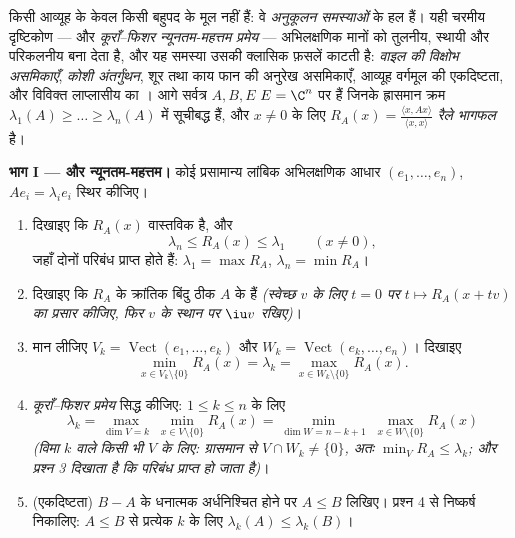 \begin{problem}\label{pb:b2:hermitian:1}
किसी  आव्यूह के  केवल किसी बहुपद के मूल नहीं हैं:
वे \emph{अनुकूलन समस्याओं} के हल हैं। यही चरमीय दृष्टिकोण --- 
और \emph{कूराँ--फिशर न्यूनतम-महत्तम प्रमेय} ---
अभिलक्षणिक मानों को तुलनीय, स्थायी और परिकलनीय बना देता है, और यह समस्या
उसकी क्लासिक फ़सलें काटती है: \emph{वाइल की विक्षोभ असमिकाएँ}, \emph{कोशी अंतर्गुंथन}, शूर तथा काय फान की अनुरेख असमिकाएँ,
आव्यूह वर्गमूल की एकदिष्टता, और विविक्त लाप्लासीय का । आगे सर्वत्र
$A, B,
E$ $E = \C^n$ पर  हैं जिनके  ह्रासमान क्रम $\lambda_1(A) \geq \dots \geq \lambda_n(A)$ में
सूचीबद्ध हैं, और $x \neq 0$ के लिए $R_A(x) = \frac{\langle x, Ax\rangle}{\langle x, x\rangle}$ \emph{रैले भागफल} है।

\medskip
\noindent\textbf{भाग I ---  और न्यूनतम-महत्तम।} कोई प्रसामान्य
लांबिक अभिलक्षणिक आधार $(e_1, \dots, e_n)$, $Ae_i =
\lambda_ie_i$ स्थिर कीजिए।
\begin{enumerate}
  \item दिखाइए कि $R_A(x)$ वास्तविक है, और
        \[
        \lambda_n \leq R_A(x) \leq \lambda_1
        \qquad (x \neq 0),
        \]
        जहाँ दोनों परिबंध प्राप्त होते हैं: $\lambda_1 = \max R_A$, $\lambda_n = \min R_A$।
  \item दिखाइए कि $R_A$ के क्रांतिक बिंदु ठीक $A$ के  हैं
        \emph{(स्वेच्छ $v$ के लिए $t = 0$ पर $t \mapsto R_A(x +
        tv)$ का प्रसार कीजिए, फिर $v$ के
        स्थान पर $\iu v$ रखिए)}।
  \item मान लीजिए $V_k = \operatorname{Vect}(e_1, \dots, e_k)$ और $W_k = \operatorname{Vect}(e_k, \dots, e_n)$। दिखाइए
        \[
        \min_{x \in V_k\setminus\{0\}} R_A(x) = \lambda_k
        = \max_{x \in W_k\setminus\{0\}} R_A(x) .
        \]
  \item \emph{कूराँ--फिशर प्रमेय} सिद्ध कीजिए: $1 \leq
        k \leq n$ के लिए
        \[
        \lambda_k = \max_{\dim V = k}\;\min_{x \in
        V\setminus\{0\}} R_A(x)
        = \min_{\dim W = n-k+1}\;\max_{x \in
        W\setminus\{0\}} R_A(x)
        \]
        \emph{(विमा $k$ वाले किसी भी $V$ के लिए: ग्रासमान से $V \cap W_k \neq
        \{0\}$, अतः
        $\min_V R_A \leq \lambda_k$; और प्रश्न 3 दिखाता है कि परिबंध प्राप्त हो जाता है)}।
  \item (एकदिष्टता) $B - A$ के धनात्मक अर्धनिश्चित होने पर $A \leq B$ लिखिए।
        प्रश्न 4 से निष्कर्ष निकालिए: $A \leq
        B$ से प्रत्येक $k$ के लिए $\lambda_k(A) \leq \lambda_k(B)$।
\end{enumerate}


\end{problem}
